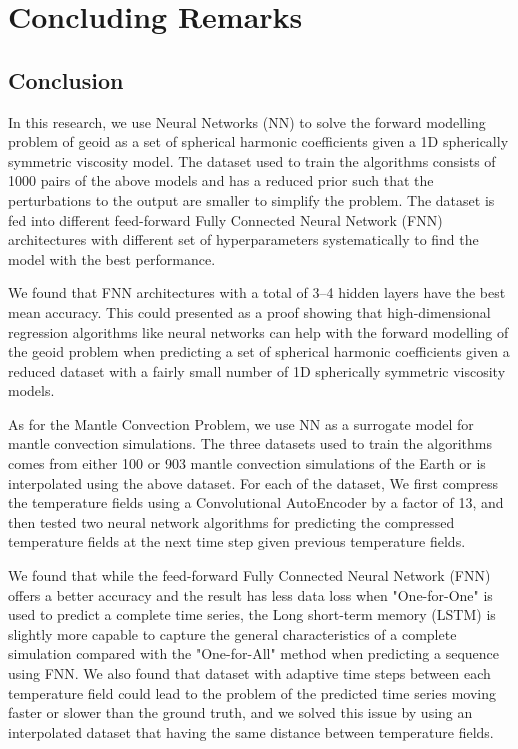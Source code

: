 \chapter{Concluding Remarks}\label{chap:conclusion}

\section{Conclusion}

In this research, we use Neural Networks (NN) to solve the forward modelling problem of geoid as a set of spherical harmonic coefficients given a 1D spherically symmetric viscosity model. The dataset used to train the algorithms consists of 1000 pairs of the above models and has a reduced prior such that the perturbations to the output are smaller to simplify the problem. The dataset is fed into different feed-forward Fully Connected Neural Network (FNN) architectures with different set of hyperparameters systematically to find the model with the best performance. 

We found that FNN architectures with a total of 3–4 hidden layers have the best mean accuracy. This could presented as a proof showing that high-dimensional regression algorithms like neural networks can help with the forward modelling of the geoid problem when predicting a set of spherical harmonic coefficients given a reduced dataset with a fairly small number of
1D spherically symmetric viscosity models.

As for the Mantle Convection Problem, we use NN as a surrogate model for mantle convection simulations. The three datasets used to train the algorithms comes from either 100 or 903 mantle convection simulations of the Earth or is interpolated using the above dataset. For each of the dataset, We first compress the temperature fields using a Convolutional AutoEncoder by a factor of 13, and then tested two neural network algorithms for predicting the compressed temperature fields at the next time step given previous temperature fields. 

We found that while the feed-forward Fully Connected Neural Network (FNN) offers a better accuracy and the result has less data loss when "One-for-One" is used to predict a complete time series, the Long short-term memory (LSTM) is slightly more capable to capture the general characteristics of a complete simulation compared with the "One-for-All" method when predicting a sequence using FNN. We also found that dataset with adaptive time steps between each temperature field could lead to the problem of the predicted time series moving faster or slower than the ground truth, and we solved this issue by using an interpolated dataset that having the same distance between temperature fields.

